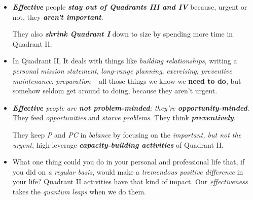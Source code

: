\documentclass[11pt]{article}
\begin{document}
\begin{itemize}
\item \emph{\textbf{Effective}} people \emph{\textbf{stay out of Quadrants III and IV}} because, urgent or not, they \emph{\textbf{aren't important}}.

They also \emph{\textbf{shrink Quadrant I }} down to size by spending more time in Quadrant II.

\item In Quadrant II, It deals with things like \emph{building relationships}, writing a \emph{personal mission statement}, \emph{long-range planning}, \emph{exercising}, \emph{preventive maintenance}, \emph{preparation} -- all those things we know we \textbf{need to do}, but somehow seldom get around to doing, because they aren't urgent.

\item \emph{\textbf{Effective} people are \textbf{not problem-minded}; they're \textbf{opportunity-minded}}. They feed \emph{opportunities} and \emph{starve problems}. They think \emph{\textbf{preventively}}. 

They keep \emph{P} and \emph{PC} in \emph{balance} by focusing on the \emph{important, but not the urgent}, high-leverage \emph{\textbf{capacity-building activities}} of Quadrant II.

\item What one thing could you do in your personal and professional life that, if you did on \emph{a regular basis}, would make a \emph{tremendous positive difference} in your life? Quadrant II activities have that kind of impact. Our \emph{effectiveness} takes the \emph{quantum leaps} when we do them.
\end{itemize}
\end{document}
